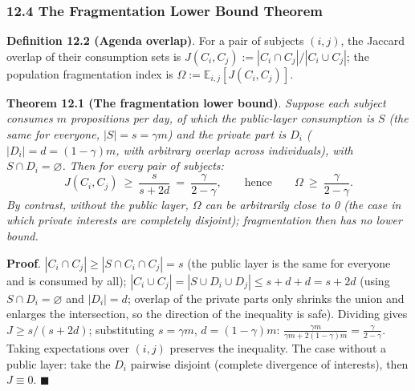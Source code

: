 \documentclass[
  11pt]{article}
\begin{document}
\subsubsection{12.4 The Fragmentation Lower Bound
Theorem}\label{the-fragmentation-lower-bound-theorem}

\textbf{Definition 12.2 (Agenda overlap)}. For a pair of subjects
\((i,j)\), the Jaccard overlap of their consumption sets is
\(J(C_i, C_j) := |C_i \cap C_j| / |C_i \cup C_j|\); the population
fragmentation index is \(\Omega := \mathbb{E}_{i,j}[J(C_i, C_j)]\).

\textbf{Theorem 12.1 (The fragmentation lower bound)}. \emph{Suppose
each subject consumes \(m\) propositions per day, of which the
public-layer consumption is \(S\) (the same for everyone,
\(|S| = s = \gamma m\)) and the private part is \(D_i\)
(\(|D_i| = d = (1-\gamma)m\), with arbitrary overlap across
individuals), with \(S \cap D_i = \varnothing\). Then for every pair of
subjects:}
\[J(C_i, C_j)\ \ge\ \frac{s}{s + 2d}\ =\ \frac{\gamma}{2 - \gamma}, \qquad\text{hence}\qquad \Omega\ \ge\ \frac{\gamma}{2-\gamma}.\]
\emph{By contrast, without the public layer, \(\Omega\) can be
arbitrarily close to 0 (the case in which private interests are
completely disjoint); fragmentation then has no lower bound.}

\textbf{Proof}. \(|C_i \cap C_j| \ge |S \cap C_i \cap C_j| = s\) (the
public layer is the same for everyone and is consumed by all);
\(|C_i \cup C_j| = |S \cup D_i \cup D_j| \le s + d + d = s + 2d\) (using
\(S\cap D_i = \varnothing\) and \(|D_i| = d\); overlap of the private
parts only shrinks the union and enlarges the intersection, so the
direction of the inequality is safe). Dividing gives \(J \ge s/(s+2d)\);
substituting \(s = \gamma m\), \(d = (1-\gamma)m\):
\(\frac{\gamma m}{\gamma m + 2(1-\gamma)m} = \frac{\gamma}{2-\gamma}\).
Taking expectations over \((i,j)\) preserves the inequality. The case
without a public layer: take the \(D_i\) pairwise disjoint (complete
divergence of interests), then \(J \equiv 0\). \(\blacksquare\)
\end{document}
